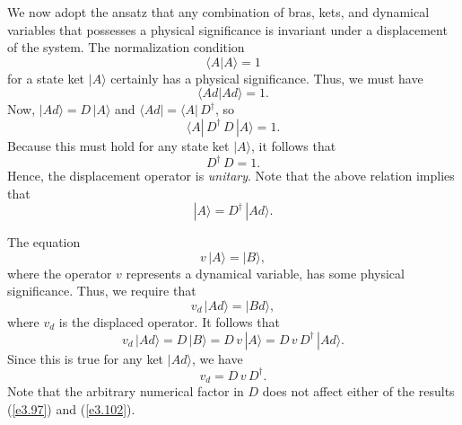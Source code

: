 We now adopt the ansatz that any combination of bras, kets, and dynamical
variables that possesses a physical significance is invariant under a displacement
of the system. The normalization condition 
\begin{equation}
\langle A|A\rangle = 1
\end{equation}
for a state ket $|A\rangle$ certainly has a physical significance. Thus, we must
have 
\begin{equation}
\langle Ad|Ad\rangle = 1.
\end{equation}
Now, $|Ad\rangle = D\,|A\rangle$ and $\langle Ad| = \langle A|\,D^{\dag}$, so
\begin{equation}
\langle A|\, D^{\dag} \,D\,|A\rangle = 1.
\end{equation}
Because this must hold for any state ket $|A\rangle$, it follows that
\begin{equation}\label{e3.97}
D^{\dag} \,D = 1.
\end{equation}
Hence, the displacement operator is {\em unitary}. 
Note that the above relation implies that
\begin{equation}
|A\rangle = D^{\dag}\, |A d\rangle.
\end{equation}

The  equation
\begin{equation}
v \,|A\rangle = |B\rangle,
\end{equation}
where the operator
$v$ represents a dynamical variable, has some physical significance. Thus,
we require that
\begin{equation}
v_d\, |Ad\rangle = |Bd\rangle,
\end{equation}
where $v_d$ is the displaced operator. It follows that
\begin{equation}
v_d\, |Ad\rangle = D\, |B\rangle = D \,v \,|A\rangle = D\, v\, D^{\dag}\, |Ad\rangle.
\end{equation}
Since this is true for any ket $|Ad\rangle$, we have
\begin{equation}\label{e3.102}
v_d = D\, v\, D^{\dag}.
\end{equation}
Note that the arbitrary numerical factor in $D$ does not affect either of the
results (\ref{e3.97}) and (\ref{e3.102}).

